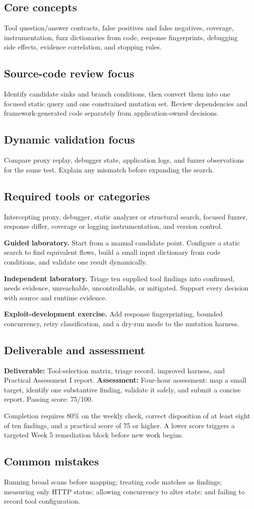 \documentclass[11pt]{article}
\newcommand{\weekfield}[2]{%
  \Needspace{5\baselineskip}
  \subsection*{#1}
  #2
}
\newcommand{\deliverable}[1]{\textbf{Deliverable:} #1}
\newcommand{\assessment}[1]{\textbf{Assessment:} #1}
\begin{document}
\weekfield{Core concepts}{Tool question/answer contracts, false positives and
false negatives, coverage, instrumentation, fuzz dictionaries from code,
response fingerprints, debugging side effects, evidence correlation, and stopping
rules.}

\weekfield{Source-code review focus}{Identify candidate sinks and branch
conditions, then convert them into one focused static query and one constrained
mutation set. Review dependencies and framework-generated code separately from
application-owned decisions.}

\weekfield{Dynamic validation focus}{Compare proxy replay, debugger state,
application logs, and fuzzer observations for the same test. Explain any mismatch
before expanding the search.}

\weekfield{Required tools or categories}{Intercepting proxy, debugger, static
analyzer or structural search, focused fuzzer, response differ, coverage or
logging instrumentation, and version control.}

\begin{labbox}
\textbf{Guided laboratory.} Start from a manual candidate point. Configure a
static search to find equivalent flows, build a small input dictionary from code
conditions, and validate one result dynamically.

\textbf{Independent laboratory.} Triage ten supplied tool findings into confirmed,
needs evidence, unreachable, uncontrollable, or mitigated. Support every decision
with source and runtime evidence.

\textbf{Exploit-development exercise.} Add response fingerprinting, bounded
concurrency, retry classification, and a dry-run mode to the mutation harness.
\end{labbox}

\weekfield{Deliverable and assessment}{\deliverable{Tool-selection matrix,
triage record, improved harness, and Practical Assessment I report.}
\assessment{Four-hour assessment: map a small target, identify one substantive
finding, validate it safely, and submit a concise report. Passing score: 75/100.}}

\begin{checkpoints}
Completion requires 80\% on the weekly check, correct disposition of at least
eight of ten findings, and a practical score of 75 or higher. A lower score
triggers a targeted Week 5 remediation block before new work begins.
\end{checkpoints}

\weekfield{Common mistakes}{Running broad scans before mapping; treating code
matches as findings; measuring only HTTP status; allowing concurrency to alter
state; and failing to record tool configuration.}
\end{document}
